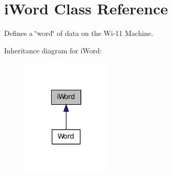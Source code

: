 \hypertarget{classiWord}{
\section{iWord Class Reference}
\label{classiWord}
}


Defines a \char`\"{}word\char`\"{} of data on the Wi-\/11 Machine.  




Inheritance diagram for iWord:
\nopagebreak
\begin{figure}[H]
\begin{center}
\leavevmode
\includegraphics[width=122pt]{classiWord__inherit__graph}
\end{center}
\end{figure}
